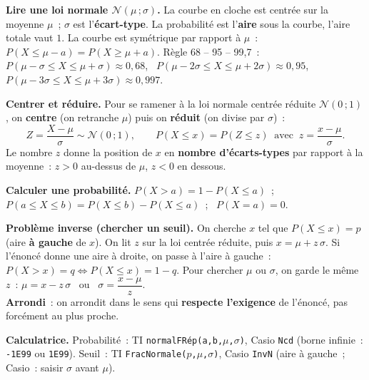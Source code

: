 \documentclass[a4paper,11pt]{article}
\begin{document}
\begin{rappel}
\textbf{Lire une loi normale $\mathcal{N}(\mu\,;\sigma)$.} La courbe en cloche est centrée sur la moyenne $\mu$~; $\sigma$ est l'\textbf{écart-type}. La probabilité est l'\textbf{aire} sous la courbe, l'aire totale vaut $1$. La courbe est symétrique par rapport à $\mu$~: $P(X \leq \mu - a) = P(X \geq \mu + a)$. Règle 68 -- 95 -- 99,7~:\\
$P(\mu-\sigma\leq X\leq\mu+\sigma)\approx 0{,}68$, \ $P(\mu-2\sigma\leq X\leq\mu+2\sigma)\approx 0{,}95$, \ $P(\mu-3\sigma\leq X\leq\mu+3\sigma)\approx 0{,}997$.

\smallskip
\textbf{Centrer et réduire.} Pour se ramener à la loi normale centrée réduite $\mathcal{N}(0\,;1)$, on \textbf{centre} (on retranche $\mu$) puis on \textbf{réduit} (on divise par $\sigma$)~:
\[
Z = \frac{X-\mu}{\sigma} \sim \mathcal{N}(0\,;1), \qquad P(X \leq x) = P(Z \leq z) \ \text{ avec } \ z = \frac{x-\mu}{\sigma}.
\]
Le nombre $z$ donne la position de $x$ en \textbf{nombre d'écarts-types} par rapport à la moyenne~: $z>0$ au-dessus de $\mu$, $z<0$ en dessous.

\begin{center}
\end{center}
\textbf{Calculer une probabilité.} $P(X > a) = 1 - P(X \leq a)$~; \ $P(a \leq X \leq b) = P(X \leq b) - P(X \leq a)$~; \ $P(X = a) = 0$.

\smallskip
\textbf{Problème inverse (chercher un seuil).} On cherche $x$ tel que $P(X \leq x) = p$ (aire \textbf{à gauche} de $x$). On lit $z$ sur la loi centrée réduite, puis $x = \mu + z\,\sigma$. Si l'énoncé donne une aire à droite, on passe à l'aire à gauche~: $P(X > x) = q \iff P(X \leq x) = 1-q$. Pour chercher $\mu$ ou $\sigma$, on garde le même $z$~: $\mu = x - z\,\sigma$ \ ou \ $\sigma = \dfrac{x-\mu}{z}$.\\
\textbf{Arrondi}~: on arrondit dans le sens qui \textbf{respecte l'exigence} de l'énoncé, pas forcément au plus proche.

\smallskip
\textbf{Calculatrice.} Probabilité~: TI \texttt{normalFRép(a,b,$\mu$,$\sigma$)}, Casio \texttt{Ncd} (borne infinie~: \texttt{-1E99} ou \texttt{1E99}). Seuil~: TI \texttt{FracNormale($p$,$\mu$,$\sigma$)}, Casio \texttt{InvN} (aire à gauche~; Casio~: saisir $\sigma$ avant $\mu$).
\end{rappel}
\end{document}
